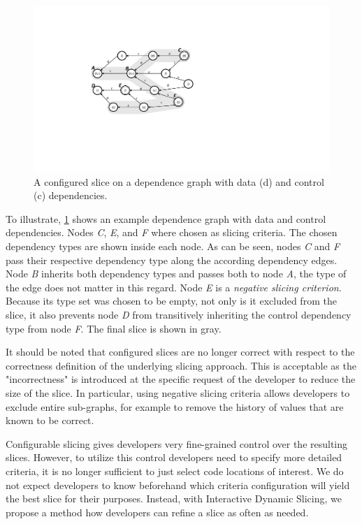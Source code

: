 \documentclass[
			english,
			]{elsarticle}
\begin{document}
\begin{figure}
	\centering
		\includegraphics[width=0.60\linewidth]{configured-slice}
	\caption{A configured slice on a dependence graph with data (d) and control (c) dependencies.}
	\label{fig:configured-slice}
\end{figure}

To illustrate, \cref{fig:configured-slice} shows an example dependence graph with data and control dependencies.
Nodes \emph{C}, \emph{E}, and \emph{F} where chosen as slicing criteria.
The chosen dependency types are shown inside each node.
As can be seen, nodes \emph{C} and \emph{F} pass their respective dependency type along the according dependency edges.
Node \emph{B} inherits both dependency types and passes both to node \emph{A}, the type of the edge does not matter in this regard.
Node \emph{E} is a \emph{negative slicing criterion}.
Because its type set was chosen to be empty, not only is it excluded from the slice, it also prevents node \emph{D} from transitively inheriting the control dependency type from node \emph{F}.
The final slice is shown in gray.

It should be noted that configured slices are no longer correct with respect to the correctness definition of the underlying slicing approach.
This is acceptable as the "incorrectness" is introduced at the specific request of the developer to reduce the size of the slice.
In particular, using negative slicing criteria allows developers to exclude entire sub-graphs, for example to remove the history of values that are known to be correct.

Configurable slicing gives developers very fine-grained control over the resulting slices.
However, to utilize this control developers need to specify more detailed criteria, it is no longer sufficient to just select code locations of interest.
We do not expect developers to know beforehand which criteria configuration will yield the best slice for their purposes.
Instead, with Interactive Dynamic Slicing, we propose a method how developers can refine a slice as often as needed.
\end{document}
